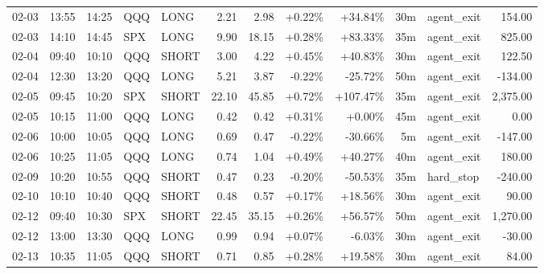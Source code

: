 \documentclass[11pt,a4paper,twoside]{article}
\begin{document}
\begin{center}
\begin{longtable}{>{\color{txtmain}}l l l l l r r r r r >{\color{txtmain}}l r}
02-03 & 13:55 & 14:25 & QQQ & LONG & 2.21 & 2.98 & \textcolor{wingreen}{+0.22\%} & \textcolor{wingreen}{+34.84\%} & 30m & agent\_exit & \textcolor{wingreen}{154.00} \\
02-03 & 14:10 & 14:45 & SPX & LONG & 9.90 & 18.15 & \textcolor{wingreen}{+0.28\%} & \textcolor{wingreen}{+83.33\%} & 35m & agent\_exit & \textcolor{wingreen}{825.00} \\
02-04 & 09:40 & 10:10 & QQQ & SHORT & 3.00 & 4.22 & \textcolor{wingreen}{+0.45\%} & \textcolor{wingreen}{+40.83\%} & 30m & agent\_exit & \textcolor{wingreen}{122.50} \\
02-04 & 12:30 & 13:20 & QQQ & LONG & 5.21 & 3.87 & \textcolor{lossred}{-0.22\%} & \textcolor{lossred}{-25.72\%} & 50m & agent\_exit & \textcolor{lossred}{-134.00} \\
02-05 & 09:45 & 10:20 & SPX & SHORT & 22.10 & 45.85 & \textcolor{wingreen}{+0.72\%} & \textcolor{wingreen}{+107.47\%} & 35m & agent\_exit & \textcolor{wingreen}{2,375.00} \\
02-05 & 10:15 & 11:00 & QQQ & LONG & 0.42 & 0.42 & \textcolor{wingreen}{+0.31\%} & \textcolor{wingreen}{+0.00\%} & 45m & agent\_exit & \textcolor{wingreen}{0.00} \\
02-06 & 10:00 & 10:05 & QQQ & LONG & 0.69 & 0.47 & \textcolor{lossred}{-0.22\%} & \textcolor{lossred}{-30.66\%} & 5m & agent\_exit & \textcolor{lossred}{-147.00} \\
02-06 & 10:25 & 11:05 & QQQ & LONG & 0.74 & 1.04 & \textcolor{wingreen}{+0.49\%} & \textcolor{wingreen}{+40.27\%} & 40m & agent\_exit & \textcolor{wingreen}{180.00} \\
02-09 & 10:20 & 10:55 & QQQ & SHORT & 0.47 & 0.23 & \textcolor{lossred}{-0.20\%} & \textcolor{lossred}{-50.53\%} & 35m & hard\_stop & \textcolor{lossred}{-240.00} \\
02-10 & 10:10 & 10:40 & QQQ & SHORT & 0.48 & 0.57 & \textcolor{wingreen}{+0.17\%} & \textcolor{wingreen}{+18.56\%} & 30m & agent\_exit & \textcolor{wingreen}{90.00} \\
02-12 & 09:40 & 10:30 & SPX & SHORT & 22.45 & 35.15 & \textcolor{wingreen}{+0.26\%} & \textcolor{wingreen}{+56.57\%} & 50m & agent\_exit & \textcolor{wingreen}{1,270.00} \\
02-12 & 13:00 & 13:30 & QQQ & LONG & 0.99 & 0.94 & \textcolor{wingreen}{+0.07\%} & \textcolor{lossred}{-6.03\%} & 30m & agent\_exit & \textcolor{lossred}{-30.00} \\
02-13 & 10:35 & 11:05 & QQQ & SHORT & 0.71 & 0.85 & \textcolor{wingreen}{+0.28\%} & \textcolor{wingreen}{+19.58\%} & 30m & agent\_exit & \textcolor{wingreen}{84.00} \\

\end{longtable}
\end{center}
\end{document}
